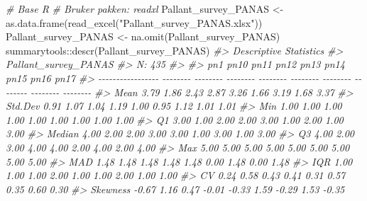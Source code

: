 \documentclass[
]{article}
\newenvironment{Shaded}{\begin{snugshade}}{\end{snugshade}}
\newcommand{\CommentTok}[1]{\textcolor[rgb]{0.56,0.35,0.01}{\textit{#1}}}
\newcommand{\FunctionTok}[1]{\textcolor[rgb]{0.00,0.00,0.00}{#1}}
\newcommand{\NormalTok}[1]{#1}
\newcommand{\OtherTok}[1]{\textcolor[rgb]{0.56,0.35,0.01}{#1}}
\newcommand{\SpecialCharTok}[1]{\textcolor[rgb]{0.00,0.00,0.00}{#1}}
\newcommand{\StringTok}[1]{\textcolor[rgb]{0.31,0.60,0.02}{#1}}
\begin{document}
\begin{Shaded}
\begin{Highlighting}[]
\CommentTok{\# Base R}
\CommentTok{\# Bruker pakken: readxl}
\NormalTok{Pallant\_survey\_PANAS }\OtherTok{\textless{}{-}} \FunctionTok{as.data.frame}\NormalTok{(}\FunctionTok{read\_excel}\NormalTok{(}\StringTok{"Pallant\_survey\_PANAS.xlsx"}\NormalTok{))}
\NormalTok{Pallant\_survey\_PANAS }\OtherTok{\textless{}{-}} \FunctionTok{na.omit}\NormalTok{(Pallant\_survey\_PANAS)}
\NormalTok{summarytools}\SpecialCharTok{::}\FunctionTok{descr}\NormalTok{(Pallant\_survey\_PANAS)}
\CommentTok{\#\textgreater{} Descriptive Statistics  }
\CommentTok{\#\textgreater{} Pallant\_survey\_PANAS  }
\CommentTok{\#\textgreater{} N: 435  }
\CommentTok{\#\textgreater{} }
\CommentTok{\#\textgreater{}                        pn1     pn10     pn11     pn12     pn13     pn14     pn15     pn16     pn17}
\CommentTok{\#\textgreater{} {-}{-}{-}{-}{-}{-}{-}{-}{-}{-}{-}{-}{-}{-}{-}{-}{-} {-}{-}{-}{-}{-}{-}{-}{-} {-}{-}{-}{-}{-}{-}{-}{-} {-}{-}{-}{-}{-}{-}{-}{-} {-}{-}{-}{-}{-}{-}{-}{-} {-}{-}{-}{-}{-}{-}{-}{-} {-}{-}{-}{-}{-}{-}{-}{-} {-}{-}{-}{-}{-}{-}{-}{-} {-}{-}{-}{-}{-}{-}{-}{-} {-}{-}{-}{-}{-}{-}{-}{-}}
\CommentTok{\#\textgreater{}              Mean     3.79     1.86     2.43     2.87     3.26     1.66     3.19     1.68     3.37}
\CommentTok{\#\textgreater{}           Std.Dev     0.91     1.07     1.04     1.19     1.00     0.95     1.12     1.01     1.01}
\CommentTok{\#\textgreater{}               Min     1.00     1.00     1.00     1.00     1.00     1.00     1.00     1.00     1.00}
\CommentTok{\#\textgreater{}                Q1     3.00     1.00     2.00     2.00     3.00     1.00     2.00     1.00     3.00}
\CommentTok{\#\textgreater{}            Median     4.00     2.00     2.00     3.00     3.00     1.00     3.00     1.00     3.00}
\CommentTok{\#\textgreater{}                Q3     4.00     2.00     3.00     4.00     4.00     2.00     4.00     2.00     4.00}
\CommentTok{\#\textgreater{}               Max     5.00     5.00     5.00     5.00     5.00     5.00     5.00     5.00     5.00}
\CommentTok{\#\textgreater{}               MAD     1.48     1.48     1.48     1.48     1.48     0.00     1.48     0.00     1.48}
\CommentTok{\#\textgreater{}               IQR     1.00     1.00     1.00     2.00     1.00     1.00     2.00     1.00     1.00}
\CommentTok{\#\textgreater{}                CV     0.24     0.58     0.43     0.41     0.31     0.57     0.35     0.60     0.30}
\CommentTok{\#\textgreater{}          Skewness    {-}0.67     1.16     0.47    {-}0.01    {-}0.33     1.59    {-}0.29     1.53    {-}0.35}

\end{Highlighting}
\end{Shaded}
\end{document}
